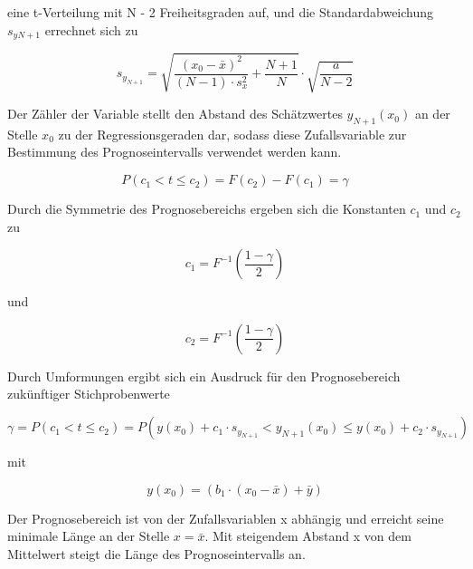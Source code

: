 \noindent eine t-Verteilung mit N - 2 Freiheitsgraden auf, und die Standardabweichung $s_{yN+1}$ errechnet sich zu

\begin{equation}\label{eq:twelveninetynine}
s_{y_{N+1} } =\sqrt{\dfrac{\left(x_{0} -\bar{x}\right)^{2} }{(N-1)\cdot s_{x}^{2}} +\dfrac{N+1}{N}} \cdot \sqrt{\dfrac{a}{N-2}}
\end{equation}

\noindent Der Z\"{a}hler der Variable stellt den Abstand des Sch\"{a}tzwertes $y_{N+1}(x_{0})$ an der Stelle $x_{0}$ zu der Regressionsgeraden dar, sodass diese Zufallsvariable zur Bestimmung des Prognoseintervalls verwendet werden kann. 

\begin{equation}\label{eq:twelveonehundred}
P(c_{1} <t\le c_{2})=F(c_{2})-F(c_{1})=\gamma
\end{equation}

\noindent Durch die Symmetrie des Prognosebereichs ergeben sich die Konstanten $c_{1}$ und $c_{2}$ zu

\begin{equation}\label{eq:twelveonehundredone}
c_{1} =F^{-1} \left(\dfrac{1-\gamma }{2} \right)
\end{equation}

\noindent und

\begin{equation}\label{eq:twelveonehundredtwo}
c_{2} =F^{-1} \left(\dfrac{1-\gamma }{2} \right)
\end{equation}

\noindent Durch Umformungen ergibt sich ein Ausdruck f\"{u}r den Prognosebereich zuk\"{u}nftiger Stichprobenwerte

\begin{equation}\label{eq:twelveonehundredthree}
\gamma =P(c_{1} <t\le c_{2})=P\left(y(x_{0})+c_{1} \cdot s_{y_{N+1} } <y_{N+1} (x_{0})\le y(x_{0})+c_{2} \cdot s_{y_{N+1} } \right)
\end{equation}

\noindent mit

\begin{equation}\label{eq:twelveonehundredfour}
y(x_{0})=\left(b_{1} \cdot (x_{0} -\bar{x})+\bar{y}\right)
\end{equation}

\noindent Der Prognosebereich ist von der Zufallsvariablen x abh\"{a}ngig und erreicht seine minimale L\"{a}nge an der Stelle $x = \bar{x}$. Mit steigendem Abstand x von dem Mittelwert steigt die L\"{a}nge des Prognoseintervalls an.\newline

